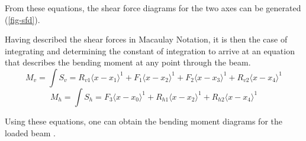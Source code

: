 From these equations, the shear force diagrams for the two axes can be generated (\cref{fig-sfd}).

\begin{figure*}[th!]
    
    \hfill{}
    \hfill{}
    \hfill{}
    \leavevmode\newline
    
    \hfill{}
    \hfill{}
    \hfill{}
    
    \vspace{2em}
    \caption{Shear force diagrams}
    \label{fig-sfd}
\end{figure*}


Having  described the shear forces in Macaulay Notation, it is then the case of integrating and determining the constant of integration to arrive at an equation that describes the bending moment at any point through the beam.
\begin{equation}
  M_v = \int S_v = R_{v1}\langle x-x_1\rangle^1 + F_{1}\langle x-x_2\rangle^1  + F_{2}\langle x-x_3\rangle^1 + R_{v2}\langle x-x_4\rangle^1
\end{equation}
\begin{equation}
  M_h = \int S_h = F_{3}\langle x-x_0\rangle^1 + R_{h1}\langle x-x_2\rangle^1 + R_{h2}\langle x-x_4\rangle^1
\end{equation}

Using these equations, one can obtain the bending moment diagrams for the loaded beam .

